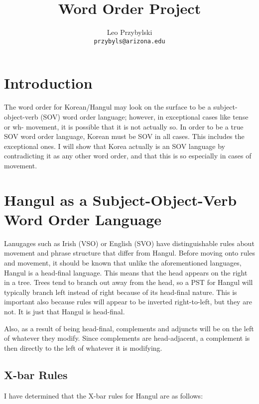 \documentclass[11pt]{report}
\title{Word Order Project}
\author{Leo Przybylski\\
\texttt{przybyls@arizona.edu}}
\date{}
\begin{document}
\maketitle
{}

\section{Introduction}
The word order for Korean/Hangul may look on the surface to be a
subject-object-verb (SOV) word order language; however, in exceptional
cases like tense or wh- movement, it is possible that it is not
actually so. In order to be a true SOV word order language, Korean
must be SOV in all cases. This includes the exceptional ones. I will show that Korea actually is an SOV language by contradicting
it as any other word order, and that this is so especially in cases of
movement.

\section{Hangul as a Subject-Object-Verb Word Order Language}
Lanugages such as Irish (VSO) or English (SVO) have distinguishable
rules about movement and phrase structure that differ from
Hangul. Before moving onto rules and movement, it should be known that
unlike the aforementioned languages, Hangul is a head-final
language. This means that the head appears on the right in a
tree. Trees tend to branch out away from the head, so a PST for Hangul
will typically branch left instead of right because of its head-final
nature. This is important also because rules will appear to be
inverted right-to-left, but they are not. It is just that Hangul is
head-final.

Also, as a result of being head-final, complements and adjuncts will
be on the left of whatever they modify. Since complements are
head-adjacent, a complement is then directly to the left of whatever
it is modifying.

\subsection{X-bar Rules}
I have determined that the X-bar rules for Hangul are as follows:
\end{document}
